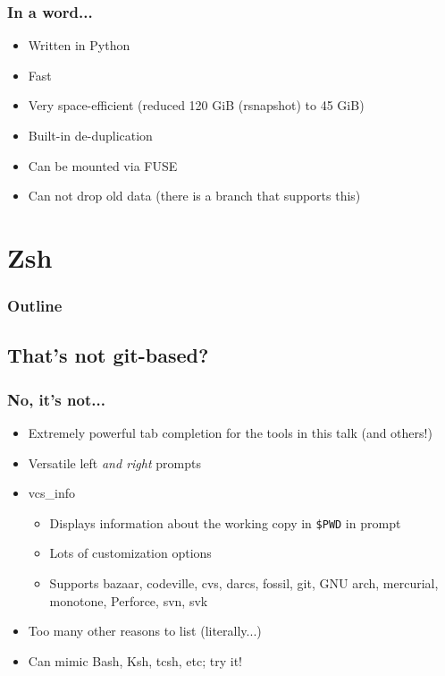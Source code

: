 \documentclass[t]{beamer}
\begin{document}
\begin{frame}
	\frametitle{In a word...}
	\begin{itemize}
		\item Written in Python
		\item Fast
		\item Very space-efficient (reduced 120 GiB (rsnapshot) to 45 GiB)
		\item Built-in de-duplication
		\item Can be mounted via FUSE
		\item Can not drop old data (there is a branch that supports this)
	\end{itemize}
\end{frame}


\section{Zsh}

\begin{frame}
	\frametitle{Outline}
	\tableofcontents[currentsection]
\end{frame}

\subsection{That's not git-based?}


\begin{frame}
	\frametitle{No, it's not...}
	\begin{itemize}
		\item Extremely powerful tab completion for the tools in this talk (and others!)
		\item Versatile left \emph{and right} prompts
		\item vcs\_info
		\begin{itemize}
			\item Displays information about the working copy in \texttt{\$PWD} in prompt
			\item Lots of customization options
			\item Supports bazaar, codeville, cvs, darcs, fossil, git, GNU arch, mercurial, monotone, Perforce, svn, svk
		\end{itemize}
		\item Too many other reasons to list (literally...)
		\item Can mimic Bash, Ksh, tcsh, etc; try it!
	\end{itemize}
\end{frame}
\end{document}
